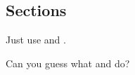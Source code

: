 \documentclass[aspectratio=169]{beamer}
\begin{document}
\subsection{Sections}
\begin{frame}{\insertsubsection}
\begin{itemize}{\small
\item Just use  and .
\item Can you guess what  and  do?
}\end{itemize}
\end{frame}

\end{document}
